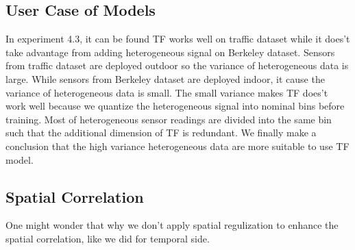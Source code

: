 \subsection{User Case of Models}
In experiment 4.3, it can be found TF works well on traffic dataset while it does't take advantage from adding heterogeneous signal on Berkeley dataset. Sensors from traffic dataset are deployed outdoor so the variance of heterogeneous data is large. While sensors from Berkeley dataset are deployed indoor, it cause the variance of heterogeneous data is small. The small variance makes TF does't work well because we quantize the heterogeneous signal into nominal bins before training. Most of heterogeneous sensor readings are divided into the same bin such that the additional dimension of TF is redundant.
We finally make a conclusion that the high variance heterogeneous data are more suitable to use TF model.

\subsection{Spatial Correlation}
One might wonder that why we don't apply spatial regulization to enhance the spatial correlation, like we did for temporal side.
